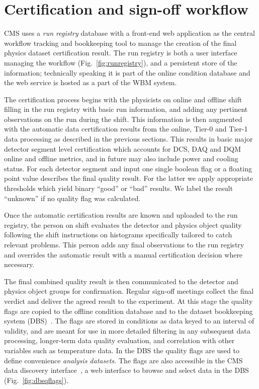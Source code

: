 \documentclass[a4paper]{jpconf}
\begin{document}
\section{Certification and sign-off workflow}\label{certification}

CMS uses a {\em run registry} database with a front-end web application as the
central workflow tracking and bookkeeping tool to manage the creation of the
final physics dataset certification result.  The run registry is both a user
interface managing the workflow (Fig.~\ref{fig:runregistry}), and a persistent
store of the information; technically speaking it is part of the online
condition database and the web service is hosted as a part of the WBM system.

The certification process begins with the physicists on online and offline
shift filling in the run registry with basic run information, and adding any
pertinent observations on the run during the shift.  This information is then
augmented with the automatic data certification results from the online,
Tier-0 and Tier-1 data processing as described in the previous sections.  This
results in basic major detector segment level certification which accounts for
DCS, DAQ and DQM online and offline metrics, and in future may also include
power and cooling status.  For each detector segment and input one single
boolean flag or a floating point value describes the final quality result.
For the latter we apply appropriate thresholds which yield binary ``good'' or
``bad'' results.  We label the result ``unknown'' if no quality flag was
calculated.

Once the automatic certification results are known and uploaded to the run
registry, the person on shift evaluates the detector and physics object
quality following the shift instructions on histograms specifically tailored
to catch relevant problems.  This person adds any final observations to the
run registry and overrides the automatic result with a manual certification
decision where necessary.

The final combined quality result is then communicated to the detector and
physics object groups for confirmation.  Regular sign-off meetings collect the
final verdict and deliver the agreed result to the experiment.  At this stage
the quality flags are copied to the offline condition database and to the
dataset bookkeeping system (DBS)~\cite{cms_dbs_07}.  The flags are stored in
conditions as data keyed to an interval of validity, and are meant for use in
more detailed filtering in any subsequent data processing, longer-term data
quality evaluation, and correlation with other variables such as temperature
data.  In the DBS the quality flags are used to define convenience {\em
  analysis datasets.}  The flags are also accessible in the CMS data discovery
interface~\cite{cms_dbs_discovery_07}, a web interface to browse and select
data in the DBS (Fig.~\ref{fig:dbsqflags}).
\end{document}
